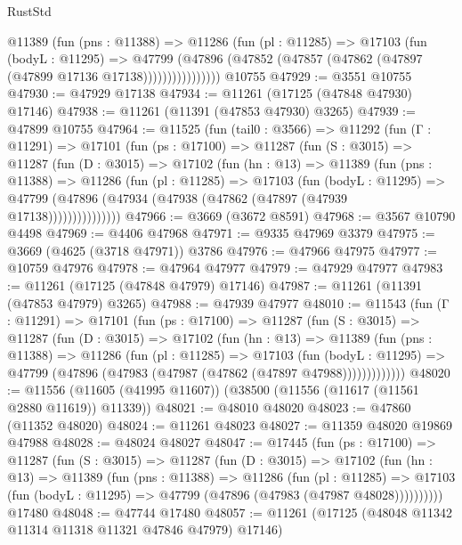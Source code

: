 \begin{lexlean}{RustStd}
\begin{coremodule}
                @11389
                  (fun (pns : @11388) =>
                  @11286
                    (fun (pl : @11285) =>
                    @17103
                      (fun (bodyL : @11295) =>
                      @47799
                        (@47896
                          (@47852 (@47857 (@47862 (@47897 (@47899 @17136 @17138))))))))))))))))
    @10755
@47929 := @3551 @10755
@47930 := @47929 @17138
@47934 := @11261 (@17125 (@47848 @47930) @17146)
@47938 := @11261 (@11391 (@47853 @47930) @3265)
@47939 := @47899 @10755
@47964 := @11525
    (fun (tail0 : @3566) =>
    @11292
      (fun (Γ : @11291) =>
      @17101
        (fun (ps : @17100) =>
        @11287
          (fun (S : @3015) =>
          @11287
            (fun (D : @3015) =>
            @17102
              (fun (hn : @13) =>
              @11389
                (fun (pns : @11388) =>
                @11286
                  (fun (pl : @11285) =>
                  @17103
                    (fun (bodyL : @11295) =>
                    @47799 (@47896 (@47934 (@47938 (@47862 (@47897 (@47939 @17138)))))))))))))))
@47966 := @3669 (@3672 @8591)
@47968 := @3567 @10790 @4498
@47969 := @4406 @47968
@47971 := @9335 @47969 @3379
@47975 := @3669 (@4625 (@3718 @47971)) @3786
@47976 := @47966 @47975
@47977 := @10759 @47976
@47978 := @47964 @47977
@47979 := @47929 @47977
@47983 := @11261 (@17125 (@47848 @47979) @17146)
@47987 := @11261 (@11391 (@47853 @47979) @3265)
@47988 := @47939 @47977
@48010 := @11543
    (fun (Γ : @11291) =>
    @17101
      (fun (ps : @17100) =>
      @11287
        (fun (S : @3015) =>
        @11287
          (fun (D : @3015) =>
          @17102
            (fun (hn : @13) =>
            @11389
              (fun (pns : @11388) =>
              @11286
                (fun (pl : @11285) =>
                @17103
                  (fun (bodyL : @11295) =>
                  @47799 (@47896 (@47983 (@47987 (@47862 (@47897 @47988)))))))))))))
@48020 := @11556 (@11605 (@41995 @11607)) (@38500 (@11556 (@11617 (@11561 @2880 @11619)) @11339))
@48021 := @48010 @48020
@48023 := @47860 (@11352 @48020)
@48024 := @11261 @48023
@48027 := @11359 @48020 @19869 @47988
@48028 := @48024 @48027
@48047 := @17445
    (fun (ps : @17100) =>
    @11287
      (fun (S : @3015) =>
      @11287
        (fun (D : @3015) =>
        @17102
          (fun (hn : @13) =>
          @11389
            (fun (pns : @11388) =>
            @11286
              (fun (pl : @11285) =>
              @17103 (fun (bodyL : @11295) => @47799 (@47896 (@47983 (@47987 @48028))))))))))
    @17480
@48048 := @47744 @17480
@48057 := @11261 (@17125 (@48048 @11342 @11314 @11318 @11321 @47846 @47979) @17146)

\end{coremodule}
\end{lexlean}
